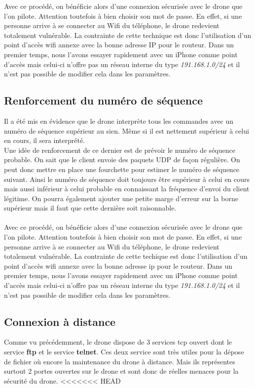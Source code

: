 Avec ce procédé, on bénéficie alors d'une connexion sécurisée avec le drone que l'on pilote. Attention toutefois à bien choisir son mot de passe. En effet, si une personne arrive à se connecter au Wifi du téléphone, le drone redevient totalement vulnérable. La contrainte de cette technique est donc l'utilisation d'un point d'accès wifi annexe avec la bonne adresse IP pour le routeur. Dans un premier temps, nous l'avons essayer rapidement avec un iPhone comme point d'accès mais celui-ci n'offre pas un réseau interne du type \textit{191.168.1.0/24} et il n'est pas possible de modifier cela dans les paramètres.

\subsection{Renforcement du numéro de séquence}
Il a été mis en évidence que le drone interprète tous les commandes avec un numéro de séquence supérieur au sien. Même si il est nettement supérieur à celui en cours, il sera interprété.\\
Une idée de renforcement de ce dernier est de prévoir le numéro de séquence probable. On sait que le client envoie des paquets UDP de façon régulière. On peut donc mettre en place une fourchette pour estimer le numéro de séquence suivant. Ainsi le numéro de séquence doit toujours être supérieur à celui en cours mais aussi inférieur à celui probable en connaissant la fréquence d’envoi du client légitime. On pourra également ajouter une petite marge d'erreur sur la borne supérieur mais il faut que cette dernière soit raisonnable.\\\\
Avec ce procédé, on bénéficie alors d'une connexion sécurisée avec le drone que l'on pilote. Attention toutefois à bien choisir son mot de passe. En effet, si une personne arrive à se connecter au Wifi du téléphone, le drone redevient totalement vulnérable. La contrainte de cette techique est donc l'utilisation d'un point d'accès wifi annexe avec la bonne adresse ip pour le routeur. Dans un premier temps, nous l'avons essayer rapidement avec un iPhone comme point d'accès mais celui-ci n'offre pas un réseau interne du type \textit{191.168.1.0/24} et il n'est pas possible de modifier cela dans les paramètres.

\subsection{Connexion à distance}
Comme vu précédemment, le drone dispose de 3 services tcp ouvert dont le service \textbf{ftp} et le service \textbf{telnet}. Ces deux service sont très utiles pour la dépose de fichier où encore la maintenance du drone à distance. Mais ils représentes surtout 2 portes ouvertes sur le drone et sont donc de réelles menaces pour la sécurité du drone.
<<<<<<< HEAD

